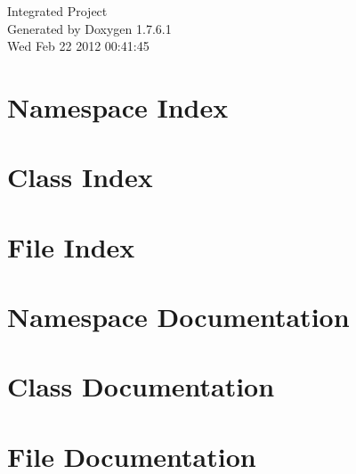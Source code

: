 \documentclass[a4paper]{book}
\begin{document}
\hypersetup{pageanchor=false,citecolor=blue}
\begin{titlepage}
\vspace*{7cm}
\begin{center}
{\Large \-Integrated \-Project }\\
\vspace*{1cm}
{\large \-Generated by Doxygen 1.7.6.1}\\
\vspace*{0.5cm}
{\small Wed Feb 22 2012 00:41:45}\\
\end{center}
\end{titlepage}
\clearemptydoublepage
{}
\tableofcontents
\clearemptydoublepage
{}
\hypersetup{pageanchor=true,citecolor=blue}
\chapter{\-Namespace \-Index}

\chapter{\-Class \-Index}

\chapter{\-File \-Index}

\chapter{\-Namespace \-Documentation}




\chapter{\-Class \-Documentation}







\chapter{\-File \-Documentation}
















\printindex
\end{document}
